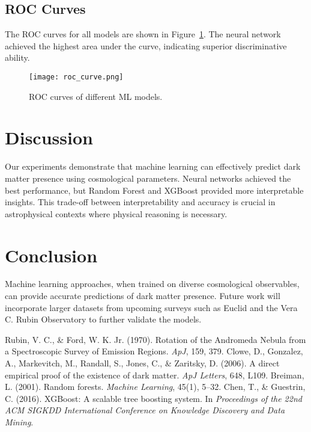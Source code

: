 \documentclass[12pt]{article}
\begin{document}
\subsection{ROC Curves}
The ROC curves for all models are shown in Figure~\ref{fig:roc}. The neural network achieved the highest area under the curve, indicating superior discriminative ability.

\begin{figure}[h!]
\centering
\texttt{[image: roc\_curve.png]}
\caption{ROC curves of different ML models.}
\label{fig:roc}
\end{figure}

\section{Discussion}
Our experiments demonstrate that machine learning can effectively predict dark matter presence using cosmological parameters. Neural networks achieved the best performance, but Random Forest and XGBoost provided more interpretable insights. This trade-off between interpretability and accuracy is crucial in astrophysical contexts where physical reasoning is necessary.

\section{Conclusion}
Machine learning approaches, when trained on diverse cosmological observables, can provide accurate predictions of dark matter presence. Future work will incorporate larger datasets from upcoming surveys such as Euclid and the Vera C. Rubin Observatory to further validate the models.

\begin{thebibliography}{99}
 Rubin, V. C., \& Ford, W. K. Jr. (1970). Rotation of the Andromeda Nebula from a Spectroscopic Survey of Emission Regions. \textit{ApJ}, 159, 379.
 Clowe, D., Gonzalez, A., Markevitch, M., Randall, S., Jones, C., \& Zaritsky, D. (2006). A direct empirical proof of the existence of dark matter. \textit{ApJ Letters}, 648, L109.
 Breiman, L. (2001). Random forests. \textit{Machine Learning}, 45(1), 5--32.
 Chen, T., \& Guestrin, C. (2016). XGBoost: A scalable tree boosting system. In \textit{Proceedings of the 22nd ACM SIGKDD International Conference on Knowledge Discovery and Data Mining}.
\end{thebibliography}
\end{document}
